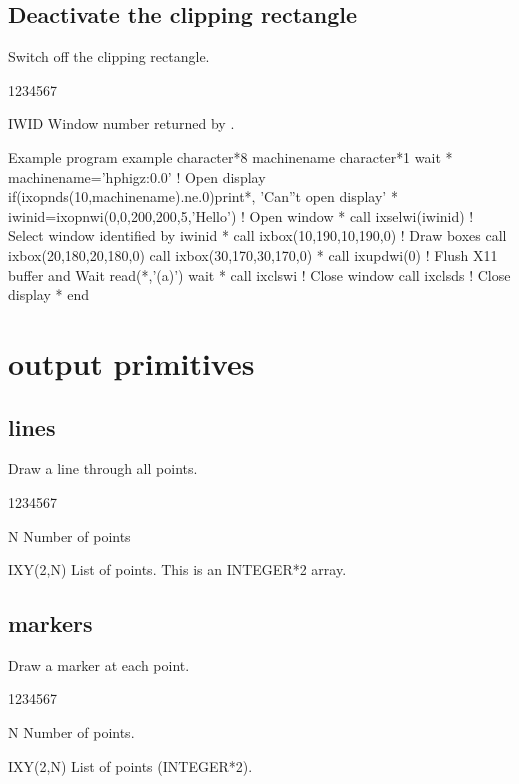 \subsection{Deactivate the  clipping rectangle}
\Action
Switch off the clipping rectangle.
\begin{DLtt}{1234567}
\item[IWID] Window number returned by .
\end{DLtt}
%
\begin{XMPt}{Example}
      program example
      character*8 machinename
      character*1 wait
*
      machinename='hphigz:0.0'               ! Open display
      if(ixopnds(10,machinename).ne.0)print*, 'Can''t open display'
*
      iwinid=ixopnwi(0,0,200,200,5,'Hello')  !  Open window
*
      call ixselwi(iwinid)                   ! Select window identified by iwinid
*
      call ixbox(10,190,10,190,0)            ! Draw boxes
      call ixbox(20,180,20,180,0)
      call ixbox(30,170,30,170,0)
*
      call ixupdwi(0)                        ! Flush X11 buffer and Wait
      read(*,'(a)') wait
*
      call ixclswi                           ! Close window
      call ixclsds                           ! Close display
*
      end
\end{XMPt}
%
%
\newpage
{}
\section{ output primitives}
\subsection{ lines}
\Action
Draw a line through all points.
\Pdesc
\begin{DLtt}{1234567}
\item[N] Number of points
\item[IXY(2,N)] List of points. This is an INTEGER*2 array.
\end{DLtt}
\subsection{ markers}
%
\Action
Draw a marker at each point.
\Pdesc
\begin{DLtt}{1234567}
\item[N] Number of points.
\item[IXY(2,N)] List of points (INTEGER*2).
\end{DLtt}
